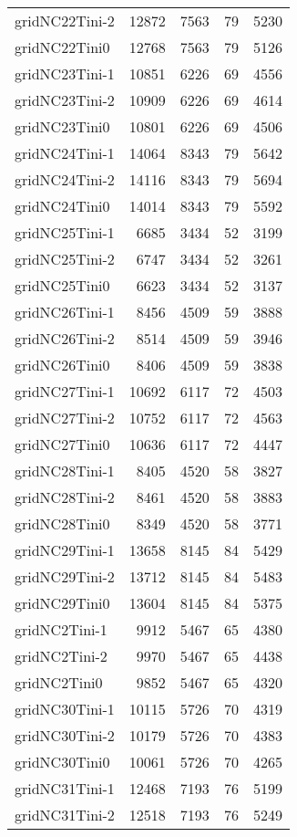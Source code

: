 \begin{longtable}{lrrrr}
gridNC22Tini-2 & 12872 & 7563 & 79 & 5230 \\
gridNC22Tini0 & 12768 & 7563 & 79 & 5126 \\
gridNC23Tini-1 & 10851 & 6226 & 69 & 4556 \\
gridNC23Tini-2 & 10909 & 6226 & 69 & 4614 \\
gridNC23Tini0 & 10801 & 6226 & 69 & 4506 \\
gridNC24Tini-1 & 14064 & 8343 & 79 & 5642 \\
gridNC24Tini-2 & 14116 & 8343 & 79 & 5694 \\
gridNC24Tini0 & 14014 & 8343 & 79 & 5592 \\
gridNC25Tini-1 & 6685 & 3434 & 52 & 3199 \\
gridNC25Tini-2 & 6747 & 3434 & 52 & 3261 \\
gridNC25Tini0 & 6623 & 3434 & 52 & 3137 \\
gridNC26Tini-1 & 8456 & 4509 & 59 & 3888 \\
gridNC26Tini-2 & 8514 & 4509 & 59 & 3946 \\
gridNC26Tini0 & 8406 & 4509 & 59 & 3838 \\
gridNC27Tini-1 & 10692 & 6117 & 72 & 4503 \\
gridNC27Tini-2 & 10752 & 6117 & 72 & 4563 \\
gridNC27Tini0 & 10636 & 6117 & 72 & 4447 \\
gridNC28Tini-1 & 8405 & 4520 & 58 & 3827 \\
gridNC28Tini-2 & 8461 & 4520 & 58 & 3883 \\
gridNC28Tini0 & 8349 & 4520 & 58 & 3771 \\
gridNC29Tini-1 & 13658 & 8145 & 84 & 5429 \\
gridNC29Tini-2 & 13712 & 8145 & 84 & 5483 \\
gridNC29Tini0 & 13604 & 8145 & 84 & 5375 \\
gridNC2Tini-1 & 9912 & 5467 & 65 & 4380 \\
gridNC2Tini-2 & 9970 & 5467 & 65 & 4438 \\
gridNC2Tini0 & 9852 & 5467 & 65 & 4320 \\
gridNC30Tini-1 & 10115 & 5726 & 70 & 4319 \\
gridNC30Tini-2 & 10179 & 5726 & 70 & 4383 \\
gridNC30Tini0 & 10061 & 5726 & 70 & 4265 \\
gridNC31Tini-1 & 12468 & 7193 & 76 & 5199 \\
gridNC31Tini-2 & 12518 & 7193 & 76 & 5249 \\

\end{longtable}
